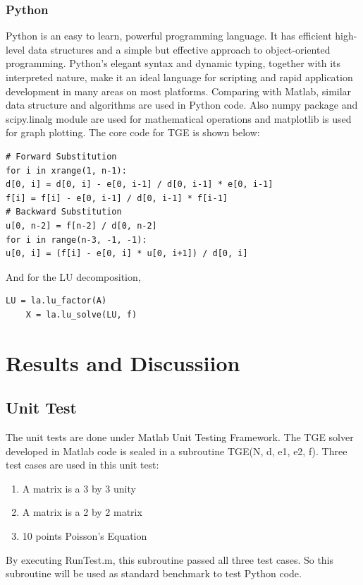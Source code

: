 \documentclass{article}
\begin{document}
\subsubsection{Python}
Python is an easy to learn, powerful programming language. It has efficient high-level data structures and a simple but effective approach to object-oriented programming. Python’s elegant syntax and dynamic typing, together with its interpreted nature, make it an ideal language for scripting and rapid application development in many areas on most platforms.
Comparing with Matlab, similar data structure and algorithms are used in Python code. Also numpy package and scipy.linalg module are used for mathematical operations and matplotlib is used for graph plotting. The core code for TGE is shown below:
  \begin{lstlisting}[frame=single]  
# Forward Substitution
for i in xrange(1, n-1):
d[0, i] = d[0, i] - e[0, i-1] / d[0, i-1] * e[0, i-1]
f[i] = f[i] - e[0, i-1] / d[0, i-1] * f[i-1]
# Backward Substitution
u[0, n-2] = f[n-2] / d[0, n-2]
for i in range(n-3, -1, -1):
u[0, i] = (f[i] - e[0, i] * u[0, i+1]) / d[0, i]
  \end{lstlisting}  
  And for the LU decomposition, 
    \begin{lstlisting}[frame=single]  
    LU = la.lu_factor(A)
    X = la.lu_solve(LU, f)
    \end{lstlisting} 

\section{Results and Discussiion}
\subsection{Unit Test}
The unit tests are done under Matlab Unit Testing Framework. The TGE solver developed in Matlab code is sealed in a subroutine TGE(N, d, e1, e2, f). Three test cases are used in this unit test: \\
\begin{enumerate}
	\item A matrix is a 3 by 3 unity
	\item A matrix is a 2 by 2 matrix
	\item 10 points Poisson's Equation
\end{enumerate}
By executing RunTest.m, this subroutine passed all three test cases. So this subroutine will be used as standard benchmark to test Python code.
\end{document}
